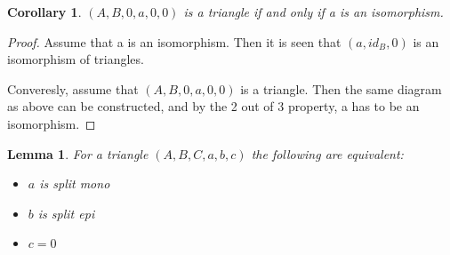 \documentclass[11pt]{article}
\newtheorem{corollary}{Corollary}[theorem]
\newtheorem{lemma}[theorem]{Lemma}
\theoremstyle{definition}
\theoremstyle{remark}
\begin{document}
            \begin{corollary}
                $(A,B,0,a,0,0)$ is a triangle if and only if a is an isomorphism.
            \end{corollary}

            \begin{proof}
                Assume that a is an isomorphism. Then it is seen that $(a,id_B,0)$ is an isomorphism of triangles.
                \begin{center}
                \end{center}
                Converesly, assume that $(A,B,0,a,0,0)$ is a triangle. Then the same diagram as above can be constructed, and by the 2 out of 3 property, a has to be an isomorphism.
            \end{proof}

            \begin{lemma}
                For a triangle $(A,B,C,a,b,c)$ the following are equivalent:

                \begin{center}
                    \begin{minipage}[c]{0.3\textwidth}
                    \end{minipage}
                    \begin{minipage}[c]{0.3\textwidth}
                        \begin{itemize}
                            \item $a$ is split mono
                            \item $b$ is split epi
                            \item $c = 0$
                        \end{itemize}
                    \end{minipage}
                \end{center}
            \end{lemma}
\end{document}
